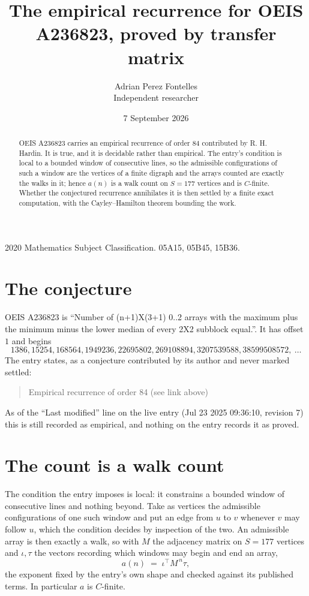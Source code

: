 \documentclass[11pt,a4paper]{article}
\title{The empirical recurrence for OEIS A236823, proved by transfer matrix}
\author{Adrian Perez Fontelles\\ \small Independent researcher}
\date{7 September 2026}
\theoremstyle{plain}
\theoremstyle{definition}
\begin{document}
\maketitle

\begin{abstract}
OEIS A236823 carries an empirical recurrence of order $84$ contributed by R. H. Hardin. It is
true, and it is decidable rather than empirical. The entry's condition is local to a bounded window of consecutive lines, so
the admissible configurations of such a window are the vertices of a finite digraph and the
arrays counted are exactly the walks in it; hence $a(n)$ is a walk count on $S=177$ vertices
and is $C$-finite. Whether the conjectured recurrence annihilates it is then settled by a
finite exact computation, with the Cayley--Hamilton theorem bounding the work.
\end{abstract}

\noindent\small 2020 Mathematics Subject Classification. 05A15, 05B45, 15B36.\normalsize

\section{The conjecture}

OEIS A236823 is ``Number of (n+1)X(3+1) 0..2 arrays with the maximum plus the minimum minus the lower median of every 2X2 subblock equal.''. It has offset $1$ and begins
\[
1386, 15254, 168564, 1949236, 22695802, 269108894, 3207539588, 38599508572,\ \dots
\]
The entry states, as a conjecture contributed by its author and never marked settled:
\begin{quote}
Empirical recurrence of order 84 (see link above)
\end{quote}
As of the ``Last modified'' line on the live entry (Jul 23 2025 09:36:10, revision 7) this is still
recorded as empirical, and nothing on the entry records it as proved.

\section{The count is a walk count}

The condition the entry imposes is local: it constrains a bounded window of consecutive lines and nothing beyond. Take as
vertices the admissible configurations of one such window and put an edge from $u$ to $v$
whenever $v$ may follow $u$, which the condition decides by inspection of the two. An
admissible array is then exactly a walk, so with $M$ the adjacency matrix on $S=177$ vertices
and $\iota,\tau$ the vectors recording which windows may begin and end an array,
\[
a(n)\;=\;\iota^{\!\top}M^{\,n}\tau ,
\]
the exponent fixed by the entry's own shape and checked against its published terms. In
particular $a$ is $C$-finite.
\end{document}
